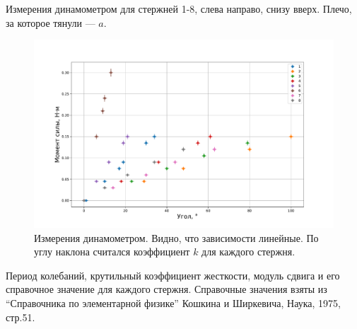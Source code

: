 \documentclass[a4paper, 12pt]{article}
\begin{document}
\begin{table}[h]
\caption{
    Измерения динамометром для стержней 1-8, слева направо, снизу вверх.
    Плечо, за которое тянули --- $a$.
}
\label{tab:force-angle}








\end{table}

\begin{figure}[h!]
\caption{
    Измерения динамометром. Видно, что зависимости линейные.
    По углу наклона считался коэффициент $k$ для каждого стержня.
}
\label{fig:torque-angle-plot}
\begin{center}
\includegraphics[width=1\linewidth]{torque-angle-plot.pdf}
\end{center}
\end{figure}

\begin{table}[!htbp]
\caption{
    Период колебаний, крутильный коэффициент жесткости,
    модуль сдвига и его справочное значение для каждого стержня.
    Справочные значения взяты из ``Справочника по элементарной физике''
    Кошкина и Ширкевича, Наука, 1975, стр.51.
}
\label{tab:main}

\end{table}
\end{document}
